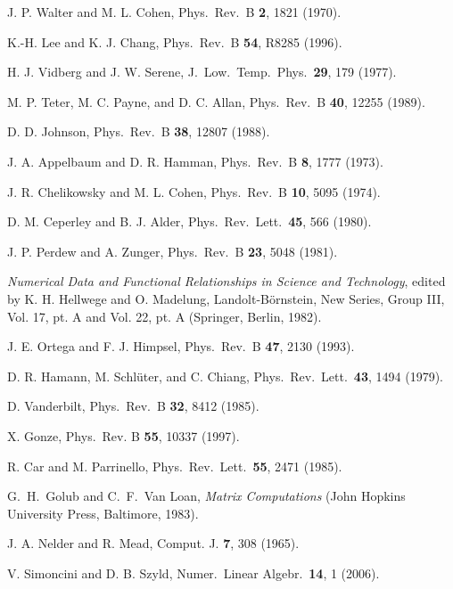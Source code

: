 \documentclass[twocolumn,prb,showpacs,superscriptaddress]{revtex4}
\begin{document}
\begin{thebibliography}{99}
J. P. Walter and M. L. Cohen,
Phys.\ Rev.\ B {\bf 2}, 1821 (1970).

K.-H. Lee and K. J. Chang,
Phys.\ Rev.\ B {\bf 54}, R8285 (1996).

H. J. Vidberg and J. W. Serene,
J.\ Low.\ Temp.\ Phys.\ {\bf 29}, 179 (1977).

M. P. Teter, M. C. Payne, and D. C. Allan,
Phys.\ Rev.\ B {\bf 40}, 12255 (1989).

D. D. Johnson, 
Phys.\ Rev.\ B {\bf 38}, 12807 (1988).

J. A. Appelbaum and D. R. Hamman, 
Phys.\ Rev.\ B {\bf 8}, 1777 (1973).

J. R. Chelikowsky and M. L. Cohen,
Phys.\ Rev.\ B {\bf 10}, 5095 (1974).

D. M. Ceperley and B. J. Alder,
Phys.\ Rev.\ Lett.\ {\bf 45}, 566 (1980).

J. P. Perdew and A. Zunger,
Phys.\ Rev.\ B {\bf 23}, 5048 (1981).

{\it Numerical Data and Functional Relationships in Science and Technology}, 
edited by K. H. Hellwege and O. Madelung, Landolt-B\"ornstein, 
New Series, Group III, Vol. 17, pt. A and Vol. 22, pt. A (Springer, Berlin, 1982).

J. E. Ortega and F. J. Himpsel, 
Phys.\ Rev.\ B {\bf 47}, 2130 (1993).

D. R. Hamann, M. Schl\"uter, and C. Chiang,
Phys.\ Rev.\ Lett.\ {\bf 43}, 1494 (1979).

D. Vanderbilt, 
Phys.\ Rev.\ B {\bf 32}, 8412 (1985).

X. Gonze,
Phys.\ Rev. B {\bf 55}, 10337 (1997).

R. Car and M. Parrinello,
Phys.\ Rev.\ Lett.\ {\bf 55}, 2471 (1985). 

G.\ H.\ Golub and C.\ F.\ Van Loan, {\it Matrix Computations} (John Hopkins University Press, Baltimore, 1983).

J. A. Nelder and R. Mead,
Comput. J. {\bf 7}, 308 (1965).

V. Simoncini and D. B. Szyld,
Numer.\ Linear Algebr.\ {\bf 14}, 1 (2006).

\end{thebibliography}
\end{document}
